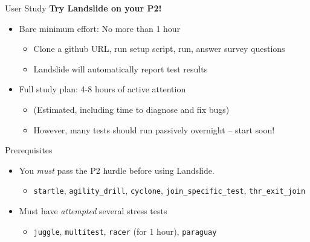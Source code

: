 \documentclass[xcolor=dvipsnames]{beamer}
\begin{document}
\begin{frame}{User Study}
	\textbf{Try Landslide on your P2!}
	\begin{itemize}
		\item Bare minimum effort: No more than 1 hour
		\begin{itemize}
			\item Clone a github URL, run setup script, run, answer survey questions
			\item Landslide will automatically report test results
		\end{itemize}
		\item Full study plan: 4-8 hours of active attention
		\begin{itemize}
			\item (Estimated, including time to diagnose and fix bugs)
			\item However, many tests should run passively overnight -- start soon!
		\end{itemize}
	\end{itemize}
	\pause
	\linegap

	Prerequisites
	\begin{itemize}
		\item You {\em must} pass the P2 hurdle before using Landslide.
		\begin{itemize}
			\item {\tt startle}, {\tt agility\_drill}, {\tt cyclone}, {\tt join\_specific\_test}, {\tt thr\_exit\_join}
		\end{itemize}
		\item Must have {\em attempted} several stress tests
		\begin{itemize}
			\item {\tt juggle}, {\tt multitest}, {\tt racer} (for 1 hour), {\tt paraguay}
		\end{itemize}

	\end{itemize}
\end{frame}
\end{document}

